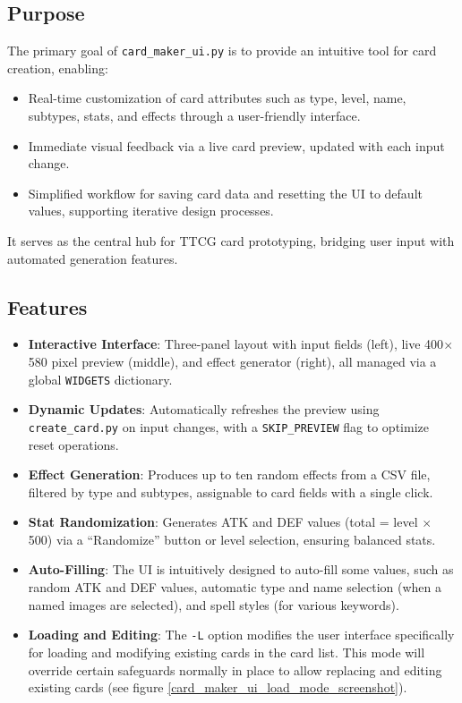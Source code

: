 \subsection{Purpose}
The primary goal of \texttt{card\_maker\_ui.py} is to provide an intuitive tool for card creation, enabling:
\begin{itemize}
	\item Real-time customization of card attributes such as type, level, name, subtypes, stats, and effects through a user-friendly interface.
	\item Immediate visual feedback via a live card preview, updated with each input change.
	\item Simplified workflow for saving card data and resetting the UI to default values, supporting iterative design processes.
\end{itemize}
It serves as the central hub for TTCG card prototyping, bridging user input with automated generation features.

\subsection{Features}
\begin{itemize}
	\item \textbf{Interactive Interface}: Three-panel layout with input fields (left), live 400$\times$580 pixel preview (middle), and effect generator (right), all managed via a global \texttt{WIDGETS} dictionary.
	\item \textbf{Dynamic Updates}: Automatically refreshes the preview using \texttt{create\_card.py} on input changes, with a \texttt{SKIP\_PREVIEW} flag to optimize reset operations.
	\item \textbf{Effect Generation}: Produces up to ten random effects from a CSV file, filtered by type and subtypes, assignable to card fields with a single click.
	\item \textbf{Stat Randomization}: Generates ATK and DEF values (total = level $\times$ 500) via a ``Randomize'' button or level selection, ensuring balanced stats.
 	\item \textbf{Auto-Filling}: The UI is intuitively designed to auto-fill some values, such as random ATK and DEF values, automatic type and name selection (when a named images are selected), and spell styles (for various keywords).
 	\item \textbf{Loading and Editing}: The \texttt{-L} option modifies the user interface specifically for loading and modifying existing cards in the card list. This mode will override certain safeguards normally in place to allow replacing and editing existing cards (see figure \ref{card_maker_ui_load_mode_screenshot}).
\end{itemize}


